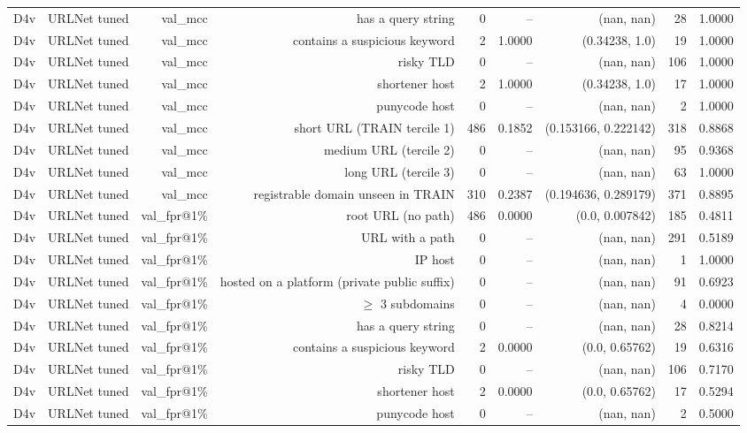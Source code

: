 \begin{table}[t]
\begin{tabular}{llrrrrrrr}
D4v & URLNet tuned & val\_mcc & has a query string & 0 & -- & (nan, nan) & 28 & 1.0000 \\
D4v & URLNet tuned & val\_mcc & contains a suspicious keyword & 2 & 1.0000 & (0.34238, 1.0) & 19 & 1.0000 \\
D4v & URLNet tuned & val\_mcc & risky TLD & 0 & -- & (nan, nan) & 106 & 1.0000 \\
D4v & URLNet tuned & val\_mcc & shortener host & 2 & 1.0000 & (0.34238, 1.0) & 17 & 1.0000 \\
D4v & URLNet tuned & val\_mcc & punycode host & 0 & -- & (nan, nan) & 2 & 1.0000 \\
D4v & URLNet tuned & val\_mcc & short URL (TRAIN tercile 1) & 486 & 0.1852 & (0.153166, 0.222142) & 318 & 0.8868 \\
D4v & URLNet tuned & val\_mcc & medium URL (tercile 2) & 0 & -- & (nan, nan) & 95 & 0.9368 \\
D4v & URLNet tuned & val\_mcc & long URL (tercile 3) & 0 & -- & (nan, nan) & 63 & 1.0000 \\
D4v & URLNet tuned & val\_mcc & registrable domain unseen in TRAIN & 310 & 0.2387 & (0.194636, 0.289179) & 371 & 0.8895 \\
D4v & URLNet tuned & val\_fpr@1\% & root URL (no path) & 486 & 0.0000 & (0.0, 0.007842) & 185 & 0.4811 \\
D4v & URLNet tuned & val\_fpr@1\% & URL with a path & 0 & -- & (nan, nan) & 291 & 0.5189 \\
D4v & URLNet tuned & val\_fpr@1\% & IP host & 0 & -- & (nan, nan) & 1 & 1.0000 \\
D4v & URLNet tuned & val\_fpr@1\% & hosted on a platform (private public suffix) & 0 & -- & (nan, nan) & 91 & 0.6923 \\
D4v & URLNet tuned & val\_fpr@1\% & $\geq$ 3 subdomains & 0 & -- & (nan, nan) & 4 & 0.0000 \\
D4v & URLNet tuned & val\_fpr@1\% & has a query string & 0 & -- & (nan, nan) & 28 & 0.8214 \\
D4v & URLNet tuned & val\_fpr@1\% & contains a suspicious keyword & 2 & 0.0000 & (0.0, 0.65762) & 19 & 0.6316 \\
D4v & URLNet tuned & val\_fpr@1\% & risky TLD & 0 & -- & (nan, nan) & 106 & 0.7170 \\
D4v & URLNet tuned & val\_fpr@1\% & shortener host & 2 & 0.0000 & (0.0, 0.65762) & 17 & 0.5294 \\
D4v & URLNet tuned & val\_fpr@1\% & punycode host & 0 & -- & (nan, nan) & 2 & 0.5000 \\

\end{tabular}
\end{table}
